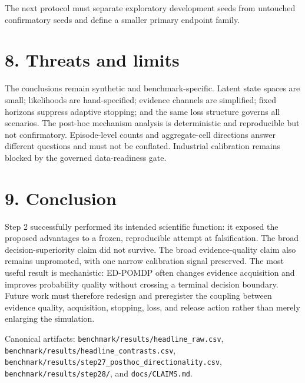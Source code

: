 \documentclass[11pt,a4paper]{article}
\begin{document}
The next protocol must separate exploratory development seeds from untouched confirmatory seeds and define a smaller primary endpoint family.

\section*{8. Threats and limits}

The conclusions remain synthetic and benchmark-specific. Latent state spaces are small; likelihoods are hand-specified; evidence channels are simplified; fixed horizons suppress adaptive stopping; and the same loss structure governs all scenarios. The post-hoc mechanism analysis is deterministic and reproducible but not confirmatory. Episode-level counts and aggregate-cell directions answer different questions and must not be conflated. Industrial calibration remains blocked by the governed data-readiness gate.

\section*{9. Conclusion}

Step 2 successfully performed its intended scientific function: it exposed the proposed advantages to a frozen, reproducible attempt at falsification. The broad decision-superiority claim did not survive. The broad evidence-quality claim also remains unpromoted, with one narrow calibration signal preserved. The most useful result is mechanistic: ED-POMDP often changes evidence acquisition and improves probability quality without crossing a terminal decision boundary. Future work must therefore redesign and preregister the coupling between evidence quality, acquisition, stopping, loss, and release action rather than merely enlarging the simulation.

\vfill
{\small\color{muted}Canonical artifacts: \texttt{benchmark/results/headline\_raw.csv}, \texttt{benchmark/results/headline\_contrasts.csv}, \texttt{benchmark/results/step27\_posthoc\_directionality.csv}, \texttt{benchmark/results/step28/}, and \texttt{docs/CLAIMS.md}.}
\end{document}

